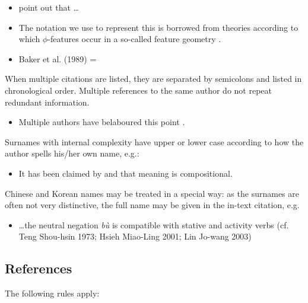 \documentclass[charis,linguex,biblatex]{glossa}
\begin{document}
\begin{itemize}
\item \citet[514]{murray:1983} point out that \ldots
\item The notation we use to represent this is borrowed from theories according to which $\phi$-features occur in a so-called feature geometry \citep[248-250]{mccarthy:1999}.
\item Baker et al. (1989) = \citet*{baker:1989}
\end{itemize}
When multiple citations are listed, they are separated by semicolons and listed in chronological order. Multiple references to the same author do not repeat redundant information.

\begin{itemize}
\item Multiple authors have belaboured this point \citep{chomsky:1981,chomsky:1986a,chomsky:1986,iverson:1989,casali:1998a,blevins:2004,franks:2005}.
\end{itemize}
Surnames with internal complexity have upper or lower case according to how the author spells his/her own name, e.g.:

\begin{itemize}
\item It has been claimed by \citet{swart:1998} and \citet{belder:2011} that meaning is compositional. 
\end{itemize}
Chinese and Korean names may be treated in a special way: as the surnames are often not very distinctive, the full name may be given in the in-text citation, e.g.

\begin{itemize}
\item  \ldots the neutral negation \textit{bù} is compatible with stative and activity verbs (cf. Teng Shou-hsin 1973; Hsieh Miao-Ling 2001; Lin Jo-wang 2003) %
\end{itemize}

\subsection{References}\label{sec:refs}

The following rules apply:
\end{document}
